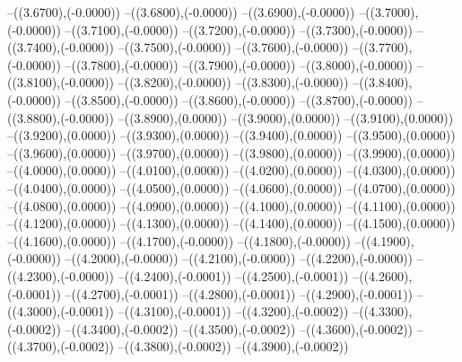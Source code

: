 {	--({\sx*(3.6700)},{\sy*(-0.0000)})
	--({\sx*(3.6800)},{\sy*(-0.0000)})
	--({\sx*(3.6900)},{\sy*(-0.0000)})
	--({\sx*(3.7000)},{\sy*(-0.0000)})
	--({\sx*(3.7100)},{\sy*(-0.0000)})
	--({\sx*(3.7200)},{\sy*(-0.0000)})
	--({\sx*(3.7300)},{\sy*(-0.0000)})
	--({\sx*(3.7400)},{\sy*(-0.0000)})
	--({\sx*(3.7500)},{\sy*(-0.0000)})
	--({\sx*(3.7600)},{\sy*(-0.0000)})
	--({\sx*(3.7700)},{\sy*(-0.0000)})
	--({\sx*(3.7800)},{\sy*(-0.0000)})
	--({\sx*(3.7900)},{\sy*(-0.0000)})
	--({\sx*(3.8000)},{\sy*(-0.0000)})
	--({\sx*(3.8100)},{\sy*(-0.0000)})
	--({\sx*(3.8200)},{\sy*(-0.0000)})
	--({\sx*(3.8300)},{\sy*(-0.0000)})
	--({\sx*(3.8400)},{\sy*(-0.0000)})
	--({\sx*(3.8500)},{\sy*(-0.0000)})
	--({\sx*(3.8600)},{\sy*(-0.0000)})
	--({\sx*(3.8700)},{\sy*(-0.0000)})
	--({\sx*(3.8800)},{\sy*(-0.0000)})
	--({\sx*(3.8900)},{\sy*(0.0000)})
	--({\sx*(3.9000)},{\sy*(0.0000)})
	--({\sx*(3.9100)},{\sy*(0.0000)})
	--({\sx*(3.9200)},{\sy*(0.0000)})
	--({\sx*(3.9300)},{\sy*(0.0000)})
	--({\sx*(3.9400)},{\sy*(0.0000)})
	--({\sx*(3.9500)},{\sy*(0.0000)})
	--({\sx*(3.9600)},{\sy*(0.0000)})
	--({\sx*(3.9700)},{\sy*(0.0000)})
	--({\sx*(3.9800)},{\sy*(0.0000)})
	--({\sx*(3.9900)},{\sy*(0.0000)})
	--({\sx*(4.0000)},{\sy*(0.0000)})
	--({\sx*(4.0100)},{\sy*(0.0000)})
	--({\sx*(4.0200)},{\sy*(0.0000)})
	--({\sx*(4.0300)},{\sy*(0.0000)})
	--({\sx*(4.0400)},{\sy*(0.0000)})
	--({\sx*(4.0500)},{\sy*(0.0000)})
	--({\sx*(4.0600)},{\sy*(0.0000)})
	--({\sx*(4.0700)},{\sy*(0.0000)})
	--({\sx*(4.0800)},{\sy*(0.0000)})
	--({\sx*(4.0900)},{\sy*(0.0000)})
	--({\sx*(4.1000)},{\sy*(0.0000)})
	--({\sx*(4.1100)},{\sy*(0.0000)})
	--({\sx*(4.1200)},{\sy*(0.0000)})
	--({\sx*(4.1300)},{\sy*(0.0000)})
	--({\sx*(4.1400)},{\sy*(0.0000)})
	--({\sx*(4.1500)},{\sy*(0.0000)})
	--({\sx*(4.1600)},{\sy*(0.0000)})
	--({\sx*(4.1700)},{\sy*(-0.0000)})
	--({\sx*(4.1800)},{\sy*(-0.0000)})
	--({\sx*(4.1900)},{\sy*(-0.0000)})
	--({\sx*(4.2000)},{\sy*(-0.0000)})
	--({\sx*(4.2100)},{\sy*(-0.0000)})
	--({\sx*(4.2200)},{\sy*(-0.0000)})
	--({\sx*(4.2300)},{\sy*(-0.0000)})
	--({\sx*(4.2400)},{\sy*(-0.0001)})
	--({\sx*(4.2500)},{\sy*(-0.0001)})
	--({\sx*(4.2600)},{\sy*(-0.0001)})
	--({\sx*(4.2700)},{\sy*(-0.0001)})
	--({\sx*(4.2800)},{\sy*(-0.0001)})
	--({\sx*(4.2900)},{\sy*(-0.0001)})
	--({\sx*(4.3000)},{\sy*(-0.0001)})
	--({\sx*(4.3100)},{\sy*(-0.0001)})
	--({\sx*(4.3200)},{\sy*(-0.0002)})
	--({\sx*(4.3300)},{\sy*(-0.0002)})
	--({\sx*(4.3400)},{\sy*(-0.0002)})
	--({\sx*(4.3500)},{\sy*(-0.0002)})
	--({\sx*(4.3600)},{\sy*(-0.0002)})
	--({\sx*(4.3700)},{\sy*(-0.0002)})
	--({\sx*(4.3800)},{\sy*(-0.0002)})
	--({\sx*(4.3900)},{\sy*(-0.0002)})
}
